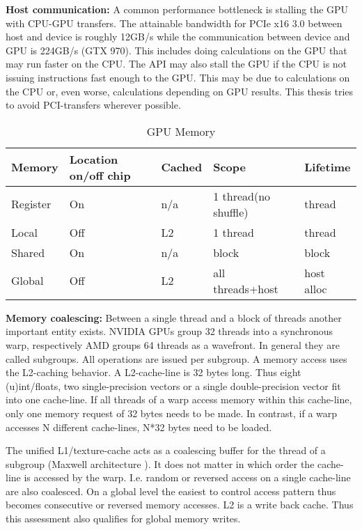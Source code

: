 \documentclass[m,times]{cgMA}
\begin{document}
\textbf{Host communication:} A common performance bottleneck is stalling the GPU with CPU-GPU transfers. The attainable bandwidth for PCIe x16 3.0 between host and device is roughly 12GB/s while the communication between device and GPU is 224GB/s (GTX 970). This includes doing calculations on the GPU that may run faster on the CPU. The API may also stall the GPU if the CPU is not issuing instructions fast enough to the GPU. This may be due to calculations on the CPU or, even worse, calculations depending on GPU results. This thesis tries to avoid PCI-transfers wherever possible.

\begin{table}
  \begin{tabular}{ | l | l | l | l | l |}    \hline
    Memory       &Location on/off chip   &Cached   &Scope                &Lifetime   \\\hline
    Register     &On                     &n/a      &1 thread(no shuffle) &thread     \\\hline
    Local        &Off                    &L2       &1 thread             &thread     \\\hline
    Shared       &On                     &n/a      &block                &block      \\\hline
    Global       &Off                    &L2       &all threads+host     &host alloc \\
    \hline
  \end{tabular}
\caption{GPU Memory \cite{NVIDIA:BEST:PRACTICE}}
\end{table}
\textbf{Memory coalescing:} Between a single thread and a block of threads another important entity exists. NVIDIA GPUs group 32 threads into a synchronous warp, respectively AMD groups 64 threads as a wavefront. In general they are called subgroups. All operations are issued per subgroup. A memory access uses the L2-caching behavior. A L2-cache-line is 32 bytes long. Thus eight (u)int/floats, two single-precision vectors or a single double-precision vector fit into one cache-line. If all threads of a warp access memory within this cache-line, only one memory request of 32 bytes needs to be made. In contrast, if a warp accesses N different cache-lines, N*32 bytes need to be loaded.

The unified L1/texture-cache acts as a coalescing buffer for the thread of a subgroup (Maxwell architecture \cite{NVIDIA:MAXWELL}). It does not matter in which order the cache-line is accessed by the warp. I.e. random or reversed access on a single cache-line are also coalesced. On a global level the easiest to control access pattern thus becomes consecutive or reversed memory accesses. L2 is a write back cache. Thus this assessment also qualifies for global memory writes. \cite{NVIDIA:MEMORY_BAND}
\end{document}
